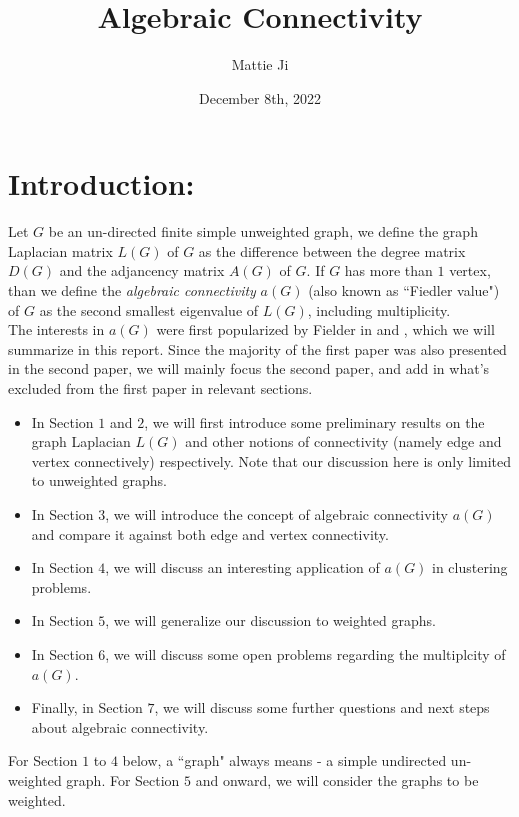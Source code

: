\documentclass{article}
\title{Algebraic Connectivity}
\author{Mattie Ji}
\date{December 8th, 2022}
\begin{document}
\maketitle



\section*{Introduction:}
Let $G$ be an un-directed finite simple unweighted graph, we define the graph Laplacian matrix $L(G)$ of $G$ as the difference between the degree matrix $D(G)$ and the adjancency matrix $A(G)$ of $G$. If $G$ has more than $1$ vertex, than we define the \textit{algebraic connectivity} $a(G)$ (also known as ``Fiedler value") of $G$ as the second smallest eigenvalue of $L(G)$, including multiplicity.\\

The interests in $a(G)$ were first popularized by Fielder in \cite{Fiedler1973} and \cite{MiroslavFiedler1989}, which we will summarize in this report. Since the majority of the first paper was also presented in the second paper, we will mainly focus the second paper, and add in what's excluded from the first paper in relevant sections.
\begin{itemize}
    \item In Section $1$ and $2$, we will first introduce some preliminary results on the graph Laplacian $L(G)$ and other notions of connectivity (namely edge and vertex connectively) respectively. Note that our discussion here is only limited to unweighted graphs.
    \item In Section $3$, we will introduce the concept of algebraic connectivity $a(G)$ and compare it against both edge and vertex connectivity.
    \item In Section $4$, we will discuss an interesting application of $a(G)$ in clustering problems.
    \item In Section $5$, we will generalize our discussion to weighted graphs.
    \item In Section $6$, we will discuss some open problems regarding the multiplcity of $a(G)$.
    \item Finally, in Section $7$, we will discuss some further questions and next steps about algebraic connectivity.
\end{itemize}
For Section $1$ to $4$ below, a ``graph" always means - a simple undirected un-weighted graph. For Section $5$ and onward, we will consider the graphs to be weighted.
\end{document}
